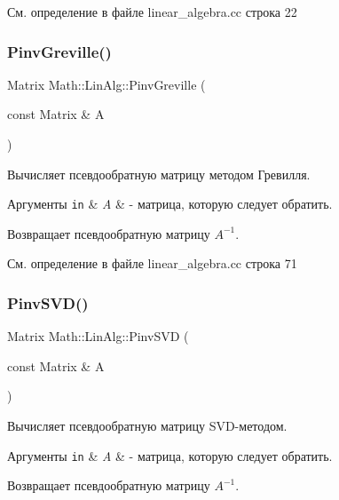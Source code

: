 См. определение в файле linear\+\_\+algebra.\+cc строка 22

\hypertarget{namespace_math_1_1_lin_alg_a03abc1453c96f7898d89262f5278aefc}{}\label{namespace_math_1_1_lin_alg_a03abc1453c96f7898d89262f5278aefc} 
\subsubsection{\texorpdfstring{Pinv\+Greville()}{PinvGreville()}}
{\footnotesize\ttfamily Matrix Math\+::\+Lin\+Alg\+::\+Pinv\+Greville (\begin{DoxyParamCaption}\item[{const Matrix \&}]{A }\end{DoxyParamCaption})}



Вычисляет псевдообратную матрицу методом Гревилля. 


\begin{DoxyParams}[1]{Аргументы}
\mbox{\tt in}  & {\em A} & -\/ матрица, которую следует обратить. \\
\hline
\end{DoxyParams}
\begin{DoxyReturn}{Возвращает}
псевдообратную матрицу $A^{-1}$. 
\end{DoxyReturn}


См. определение в файле linear\+\_\+algebra.\+cc строка 71

\hypertarget{namespace_math_1_1_lin_alg_adaef1c5da9ab98ab6e106086383e3ed6}{}\label{namespace_math_1_1_lin_alg_adaef1c5da9ab98ab6e106086383e3ed6} 
\subsubsection{\texorpdfstring{Pinv\+S\+V\+D()}{PinvSVD()}}
{\footnotesize\ttfamily Matrix Math\+::\+Lin\+Alg\+::\+Pinv\+S\+VD (\begin{DoxyParamCaption}\item[{const Matrix \&}]{A }\end{DoxyParamCaption})}



Вычисляет псевдообратную матрицу S\+V\+D-\/методом. 


\begin{DoxyParams}[1]{Аргументы}
\mbox{\tt in}  & {\em A} & -\/ матрица, которую следует обратить. \\
\hline
\end{DoxyParams}
\begin{DoxyReturn}{Возвращает}
псевдообратную матрицу $A^{-1}$. 
\end{DoxyReturn}


